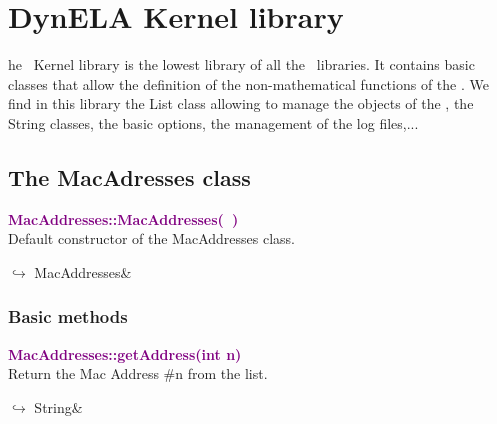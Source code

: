 %
%
%
\chapter{DynELA Kernel library}

\startcontents[chapters]
\printmyminitoc[2]he \DynELA~Kernel library is the lowest library of all the \DynELA~libraries. It contains basic classes that allow the definition of the non-mathematical functions of the \DynELA. We find in this library the List class allowing to manage the objects of the \DynELA, the String classes, the basic options, the management of the log files,...

\section{The MacAdresses class}



\textcolor{purple}{\textbf{MacAddresses::MacAddresses(~)}}\label{MacAddresses::MacAddresses()}\\
Default constructor of the MacAddresses class.\vspace*{-0.5em}
\begin{tcolorbox}[grow to left by=-1cm, width=\textwidth-1cm,myArgs,tabularx={l|R}]
$\hookrightarrow$ MacAddresses&
\end{tcolorbox}


\subsection{Basic methods}

\textcolor{purple}{\textbf{MacAddresses::getAddress(int n)}}\label{MacAddresses::getAddress(int n)}\\
Return the Mac Address \#n from the list.\vspace*{-0.5em}
\begin{tcolorbox}[grow to left by=-1cm, width=\textwidth-1cm,myArgs,tabularx={l|R}]
$\hookrightarrow$ String&
\end{tcolorbox}

